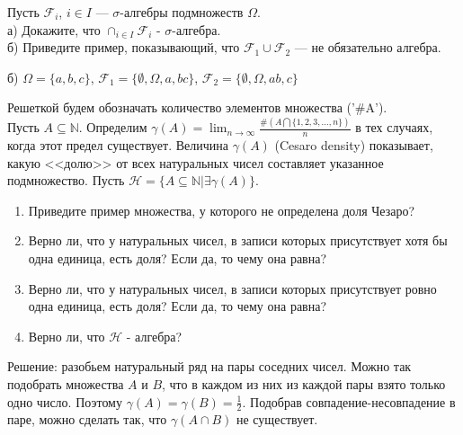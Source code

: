 \begin{solution}
\begin{problem}
Пусть $\mathcal{F}_{i}$, $i\in I$ --- $\sigma$-алгебры подмножеств
$\Omega$. \\
а) Докажите, что $\cap_{i\in I}\mathcal{F}_{i}$ -
$\sigma$-алгебра. \\
б) Приведите пример, показывающий, что
$\mathcal{F}_{1}\cup\mathcal{F}_{2}$ --- не обязательно алгебра. 
\end{problem} 
\begin{solution} 
 б) $\Omega=\{a,b,c\}$, $\mathcal{F}_{1}=\{\emptyset,\Omega,a,bc\}$, $\mathcal{F}_{2}=\{\emptyset,\Omega,ab,c\}$
\end{solution}

\begin{problem}
Решеткой будем обозначать количество элементов множества ('\#A').\\
Пусть $A \subseteq \mathbb{N}$. Определим
$\gamma(A)=\lim_{n\rightarrow \infty}\frac{\#(A\bigcap
\{1,2,3,\ldots,n\})}{n}$ в тех случаях, когда этот предел существует.
Величина $\gamma(A)$ (Cesaro density) показывает, какую <<долю>> от
всех натуральных чисел составляет указанное подмножество. Пусть
$\mathcal{H}=\{A\subseteq \mathbb{N}|\exists \gamma(A)\}$. 

\begin{enumerate}
\item Приведите пример множества, у которого не определена доля Чезаро?
\item Верно ли, что у натуральных чисел, в записи которых присутствует
хотя бы одна единица, есть доля? Если да, то чему она равна?
\item Верно ли, что у натуральных чисел, в записи которых присутствует
ровно одна единица, есть доля? Если да, то чему она равна?
\item Верно
ли, что $\mathcal{H}$ -
алгебра?
\end{enumerate}
 
\end{problem} 
\begin{solution} 

Решение: разобьем натуральный ряд на пары соседних чисел. Можно
так подобрать множества $A$ и $B$, что в каждом из них из каждой
пары взято только одно число. Поэтому
$\gamma(A)=\gamma(B)=\frac{1}{2}$. Подобрав
совпадение-несовпадение в паре, можно сделать так, что
$\gamma(A\cap B)$ не существует. 
\end{solution}


\end{solution}
